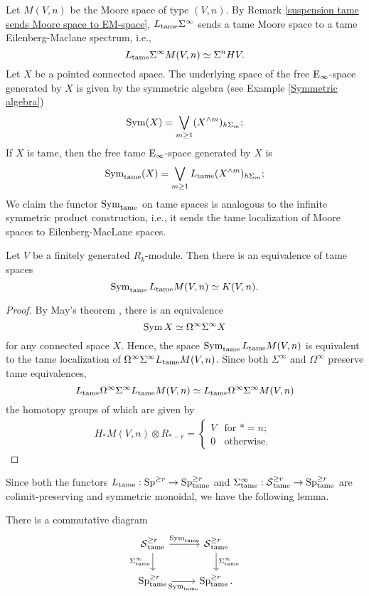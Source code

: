 Let $M(V,n)$ be the Moore space of type $(V,n)$.
By Remark \ref{suspension tame sends Moore space to EM-space}, $L_{\operatorname{\operatorname{tame}}}\Sigma^{\infty}$ sends a tame Moore space to a tame Eilenberg-Maclane spectrum, i.e., 
$$
L_{\operatorname{\operatorname{tame}}}\Sigma^{\infty} M(V,n) \simeq  \Sigma^n H V.
$$
Let $X$ be a pointed connected space. The underlying space of the
free $\operatorname{E}_{\infty}$-space generated by $X$ is given by the symmetric algebra (see Example \ref{Symmetric algebra})
\[
\operatorname{Sym}(X) = \bigvee_{m\geq 1} (X^{\wedge m})_{h\Sigma_m};
\]
If $X$ is tame, then the free tame $\operatorname{E}_{\infty}$-space generated by $X$ is 
\[
\operatorname{Sym}_{\operatorname{\operatorname{tame}}}(X) = \bigvee_{m\geq 1} L_{\operatorname{\operatorname{tame}}}(X^{\wedge m})_{h\Sigma_m};
\]
We claim the functor $\operatorname{Sym}_{\operatorname{\operatorname{tame}}}$ on tame spaces is analogous to the infinite symmetric product construction, i.e., it sends the tame localization of Moore spaces to Eilenberg-MacLane spaces.
\begin{lemma}
\label{Lemma 4.1.2.}
	Let $V$ be a finitely generated $R_k$-module.
	Then there is an equivalence of tame spaces
	$$
	 \operatorname{Sym}_{\operatorname{\operatorname{tame}}} L_{\operatorname{\operatorname{tame}}}M(V, n)\simeq K(V, n).
	$$
\end{lemma}
\begin{proof}
	By May's theorem \cite[6.3]{May_Iterated_Loop_Spaces}, there is an equivalence 
	$$
	\operatorname{Sym} X \simeq \Omega^{\infty}\Sigma^{\infty} X
	$$
	for any connected space $X$.
	Hence, the space $\operatorname{Sym}_{\operatorname{\operatorname{tame}}} L_{\operatorname{\operatorname{tame}}} M(V,n)$ is equivalent to the tame localization of $\Omega^{\infty}\Sigma^{\infty} L_{\operatorname{\operatorname{tame}}}M(V, n)$.
	Since both $\Sigma^{\infty}$ and $\Omega^{\infty}$ preserve tame equivalences,
	$$
	L_{\operatorname{\operatorname{tame}}}\Omega^{\infty}\Sigma^{\infty} L_{\operatorname{\operatorname{tame}}}M(V, n) 
	\simeq 
	L_{\operatorname{\operatorname{tame}}}\Omega^{\infty}\Sigma^{\infty}M(V, n) 
	$$
	the homotopy groups of which are given by 
	\begin{align*}
		H_* M(V, n)\otimes R_{*-r}= \begin{cases}
			V & \text{for } * = n;\\
			0 & \text{otherwise. }
		\end{cases}
	\end{align*}
\end{proof}

Since both the functors $L_{\operatorname{\operatorname{tame}}}:\operatorname{Sp}^{\geq r}\to \operatorname{Sp}^{\geq r}_{\operatorname{\operatorname{tame}}}$ and $\Sigma^{\infty}_{\operatorname{\operatorname{tame}}}:\operatorname{\mathcal{S}}^{\geq r}_{\operatorname{\operatorname{tame}}}\to \operatorname{Sp}^{\geq r}_{\operatorname{\operatorname{tame}}}$ are colimit-preserving and symmetric monoidal, we have the following lemma.
\begin{lemma}
\label{Sym commutes with Sigma infinity}
There is a commutative diagram
\[
\begin{tikzcd}
    	\Space^{\geq r}_{\tame} & \Space^{\geq r}_{\tame}\\
	\Sp_{\tame}^{\geq r} & \Sp_{\tame}^{\geq r}.
	\arrow[from=1-1, to= 1-2, "\Sym_{\tame}"]
	\arrow[from=1-1, to=2-1, "\Sigma_{\tame}^{\infty}" left]
	\arrow[from=1-2, to=2-2, "\Sigma_{\tame}^{\infty}"]
	\arrow[from=2-1, to= 2-2, "\Sym_{\tame}" below]
\end{tikzcd}
\]
\end{lemma}

